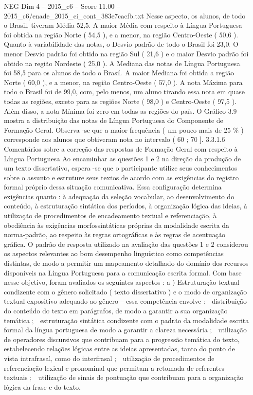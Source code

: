 \begin{textsample}{NEG Dim 4 – 2015\_c6 – Score 11.00 – 2015\_c6/enade\_2015\_ci\_cont\_383e7cacfb.txt}
Nesse aspecto, os alunos, de todo o Brasil, tiveram Média 52,5.
A maior Média com respeito à Língua Portuguesa foi obtida na região Norte ( 54,5 ), e a menor, na região Centro-Oeste ( 50,6 ).
Quanto à variabilidade das notas, o Desvio padrão de todo o Brasil foi 23,0.
O menor Desvio padrão foi obtido na região Sul ( 21,6 ) e o maior Desvio padrão foi obtido na região Nordeste ( 25,0 ).
A Mediana das notas de Língua Portuguesa foi 58,5 para os alunos de todo o Brasil.
A maior Mediana foi obtida a região Norte ( 60,0 ), e a menor, na região Centro-Oeste ( 57,0 ).
A nota Máxima para todo o Brasil foi de 99,0, com, pelo menos, um aluno tirando essa nota em quase todas as regiões, exceto para as regiões Norte ( 98,0 ) e Centro-Oeste ( 97,5 ).
Além disso, a nota Mínima foi zero em todas as regiões do país.
O Gráfico 3.9 mostra a distribuição das notas de Língua Portuguesa do Componente de Formação Geral.
Observa -se que a maior frequência ( um pouco mais de 25 \% ) corresponde aos alunos que obtiveram nota no intervalo ( 60 ; 70 ]. 3.3.1.6 Comentários sobre a correção das respostas de Formação Geral com respeito à Língua Portuguesa Ao encaminhar as questões 1 e 2 na direção da produção de um texto dissertativo, espera -se que o participante utilize seus conhecimentos sobre o assunto e estruture seus textos de acordo com as exigências do registro formal próprio dessa situação comunicativa.
Essa configuração determina exigências quanto : à adequação da seleção vocabular, ao desenvolvimento do conteúdo, à estruturação sintática dos períodos, à organização lógica das ideias, à utilização de procedimentos de encadeamento textual e referenciação, à obediência às exigências morfossintáticas próprias da modalidade escrita da norma-padrão, ao respeito às regras ortográficas e às regras de acentuação gráfica.
O padrão de resposta utilizado na avaliação das questões 1 e 2 considerou os aspectos relevantes ao bom desempenho linguístico como competências distintas, de modo a permitir um mapeamento detalhado do domínio dos recursos disponíveis na Língua Portuguesa para a comunicação escrita formal.
Com base nesse objetivo, foram avaliados os seguintes aspectos : a ) Estruturação textual condizente com o gênero solicitado ( texto dissertativo ) e o modo de organização textual expositivo adequado ao gênero – essa competência envolve :  distribuição do conteúdo do texto em parágrafos, de modo a garantir a sua organização temática ;  estruturação sintática condizente com o padrão da modalidade escrita formal da língua portuguesa de modo a garantir a clareza necessária ;  utilização de operadores discursivos que contribuam para a progressão temática do texto, estabelecendo relações lógicas entre as ideias apresentadas, tanto do ponto de vista intrafrasal, como do interfrasal ;  utilização de procedimentos de referenciação lexical e pronominal que permitam a retomada de referentes textuais ;  utilização de sinais de pontuação que contribuam para a organização lógica da frase e do texto.

\end{textsample}
